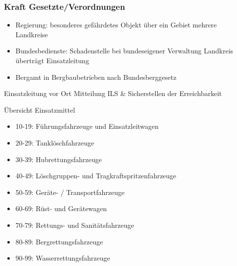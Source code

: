 \begin{normbox}{\subsubsection{Kraft Gesetzte/Verordnungen}}
    \begin{itemize}
        \item Regierung: besonderes gefährdetes Objekt über ein Gebiet mehrere Landkreise
        \item Bundesbedienste: Schadenstelle bei bundeseigener Verwaltung \ra Landkreis überträgt Einsatzleitung 
        \item Bergamt in Bergbaubetrieben nach Bundesberggesetz
    \end{itemize}
\end{normbox}
\begin{warningbox}{Einsatzleitung vor Ort}
    Mitteilung ILS \& Sicherstellen der Erreichbarkeit
\end{warningbox}
\begin{hintbox}{Übersicht Einsatzmittel}
    \begin{itemize}
        \item 10-19: Führungsfahrzeuge und Einsatzleitwagen
        \item 20-29: Tanklöschfahrzeuge
        \item 30-39: Hubrettungsfahrzeuge
        \item 40-49: Löschgruppen- und Tragkraftspritzenfahrzeuge
        \item 50-59: Geräte- / Transportfahrzeuge
        \item 60-69: Rüst- und Gerätewagen
        \item 70-79: Rettungs- und Sanitätsfahrzeuge
        \item 80-89: Bergrettungsfahrzeuge
        \item 90-99: Wasserrettungsfahrzeuge
    \end{itemize}
\end{hintbox}
